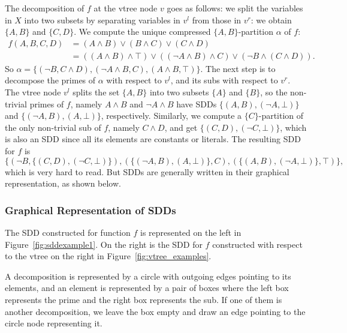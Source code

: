 \documentclass[11pt]{report}
\begin{document}
The decomposition of $f$ at the vtree node $v$ goes as follows: we split the variables in $X$ into two subsets by separating variables in $v^l$ from those in $v^r$: we obtain $\{A, B\}$ and $\{C, D\}$. We compute the unique compressed $\{A, B\}$-partition $\alpha$ of $f$:
\begin{align*}
f(A, B, C, D) &= (A \land B) \lor (B \land C) \lor (C \land D)\\
&= ((A \land B) \land \top) \lor ((\lnot A \land B) \land C) \lor (\lnot B \land (C \land D)).
\end{align*}
So $\alpha = \{(\lnot B , C\land D), (\lnot A \land B, C), (A \land B, \top)\}$. The next step is to decompose the primes of $\alpha$ with respect to $v^l$, and its subs with respect to $v^r$. 
The vtree node $v^l$ splits the set $\{A, B\}$ into two subsets $\{A\}$ and $\{B\}$, so the non-trivial primes of $f$, namely $A \land B$ and $\lnot A \land B$ have SDDs $\{(A,B), (\lnot A, 
\bot)\}$ and $\{(\lnot A, B), (A, \bot)\}$, respectively. Similarly, we compute a $\{C\}$-partition of the only non-trivial sub of $f$, namely $C \land D$, and get $\{(C, D), (\lnot C, \bot)\}$, which is also an SDD since all its elements are constants or literals. 
The resulting SDD for $f$ is
$$\{(\lnot B , \{(C, D), (\lnot C, \bot)\}), (\{(\lnot A, B), (A, \bot)\}, C), (\{(A, B), (\lnot A, \bot)\}, \top)\},$$
which is very hard to read. But SDDs are generally written in their graphical representation, as shown below.

\subsubsection{Graphical Representation of SDDs}

The SDD constructed for function $f$ is represented on the left in Figure~\ref{fig:sddexample1}. On the right is the SDD for $f$ constructed with respect to the vtree on the right in Figure~\ref{fig:vtree_examples}.

A decomposition is represented by a circle with outgoing edges pointing to its elements, and an element is represented by a pair of boxes where the left box represents the prime and the right box represents the sub. If one of them is another decomposition, we leave the box empty and draw an edge pointing to the circle node representing it.
\end{document}
